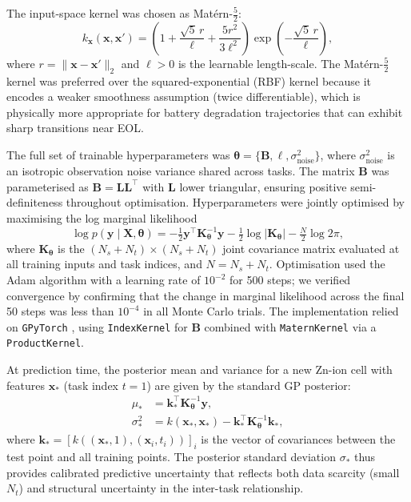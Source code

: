 The input-space kernel was chosen as Mat\'{e}rn-$\tfrac{5}{2}$:
\begin{equation}
  k_{\mathbf{x}}(\mathbf{x},\mathbf{x}') =
  \left(1 + \frac{\sqrt{5}\,r}{\ell} + \frac{5r^2}{3\ell^2}\right)
  \exp\!\left(-\frac{\sqrt{5}\,r}{\ell}\right),
  \label{eq:matern52}
\end{equation}
where $r = \|\mathbf{x} - \mathbf{x}'\|_2$ and $\ell > 0$ is the
learnable length-scale.  The Mat\'{e}rn-$\tfrac{5}{2}$ kernel was preferred
over the squared-exponential (RBF) kernel because it encodes a weaker
smoothness assumption (twice differentiable), which is physically more
appropriate for battery degradation trajectories that can exhibit
sharp transitions near EOL.

The full set of trainable hyperparameters was
$\boldsymbol{\theta} = \{\mathbf{B}, \ell, \sigma^2_{\mathrm{noise}}\}$,
where $\sigma^2_{\mathrm{noise}}$ is an isotropic observation noise variance
shared across tasks.  The matrix $\mathbf{B}$ was parameterised as
$\mathbf{B} = \mathbf{L}\mathbf{L}^{\top}$ with $\mathbf{L}$ lower triangular,
ensuring positive semi-definiteness throughout optimisation.
Hyperparameters were jointly optimised by maximising the log marginal likelihood
\begin{equation}
  \log p(\mathbf{y} \mid \mathbf{X}, \boldsymbol{\theta}) =
  -\tfrac{1}{2}\mathbf{y}^{\top}\mathbf{K}_{\boldsymbol{\theta}}^{-1}\mathbf{y}
  -\tfrac{1}{2}\log|\mathbf{K}_{\boldsymbol{\theta}}|
  -\tfrac{N}{2}\log 2\pi,
  \label{eq:mll}
\end{equation}
where $\mathbf{K}_{\boldsymbol{\theta}}$ is the $(N_s + N_t) \times (N_s + N_t)$
joint covariance matrix evaluated at all training inputs and task indices,
and $N = N_s + N_t$.  Optimisation used the Adam algorithm with a learning
rate of $10^{-2}$ for 500 steps; we verified convergence by confirming that
the change in marginal likelihood across the final 50 steps was less than
$10^{-4}$ in all Monte Carlo trials.  The implementation relied on
\texttt{GPyTorch} \cite{gardner2018}, using \texttt{IndexKernel} for
$\mathbf{B}$ combined with \texttt{MaternKernel} via a \texttt{ProductKernel}.

At prediction time, the posterior mean and variance for a new Zn-ion cell
with features $\mathbf{x}_*$ (task index $t=1$) are given by the standard GP
posterior:
\begin{align}
  \mu_* &= \mathbf{k}_*^{\top}\mathbf{K}_{\boldsymbol{\theta}}^{-1}\mathbf{y},
  \label{eq:posterior_mean} \\
  \sigma^2_* &= k(\mathbf{x}_*,\mathbf{x}_*) - \mathbf{k}_*^{\top}\mathbf{K}_{\boldsymbol{\theta}}^{-1}\mathbf{k}_*,
  \label{eq:posterior_var}
\end{align}
where $\mathbf{k}_* = [k((\mathbf{x}_*,1),(\mathbf{x}_i,t_i))]_i$ is the
vector of covariances between the test point and all training points.  The
posterior standard deviation $\sigma_*$ thus provides calibrated predictive
uncertainty that reflects both data scarcity (small $N_t$) and structural
uncertainty in the inter-task relationship.

